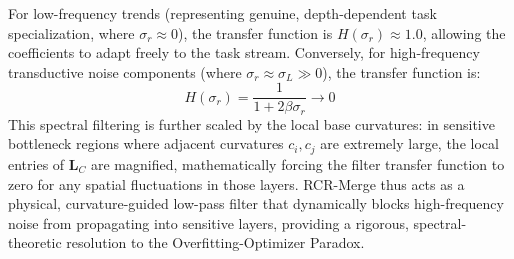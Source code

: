 For low-frequency trends (representing genuine, depth-dependent task specialization, where $\sigma_r \approx 0$), the transfer function is $H(\sigma_r) \approx 1.0$, allowing the coefficients to adapt freely to the task stream. Conversely, for high-frequency transductive noise components (where $\sigma_r \approx \sigma_L \gg 0$), the transfer function is:
\begin{equation}
H(\sigma_r) = \frac{1}{1 + 2 \beta \sigma_r} \to 0
\end{equation}
This spectral filtering is further scaled by the local base curvatures: in sensitive bottleneck regions where adjacent curvatures $c_i, c_j$ are extremely large, the local entries of $\mathbf{L}_C$ are magnified, mathematically forcing the filter transfer function to zero for any spatial fluctuations in those layers. RCR-Merge thus acts as a physical, curvature-guided low-pass filter that dynamically blocks high-frequency noise from propagating into sensitive layers, providing a rigorous, spectral-theoretic resolution to the Overfitting-Optimizer Paradox.